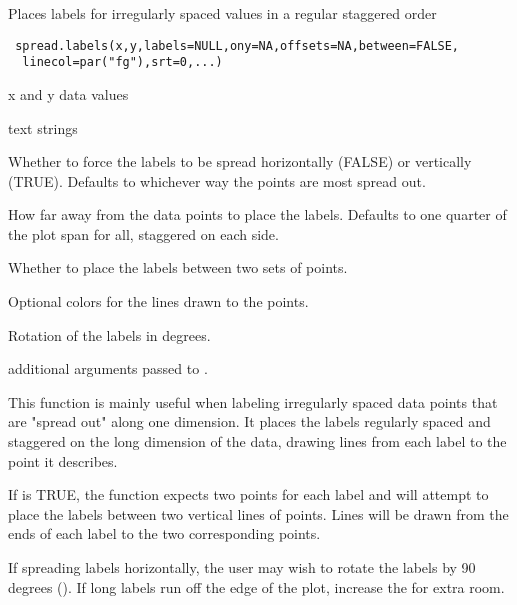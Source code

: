 \begin{Description}\relax
Places labels for irregularly spaced values in a regular staggered order
\end{Description}
\begin{Usage}
\begin{verbatim}
 spread.labels(x,y,labels=NULL,ony=NA,offsets=NA,between=FALSE,
  linecol=par("fg"),srt=0,...)
\end{verbatim}
\end{Usage}
\begin{Arguments}
\begin{ldescription}
\item[\code{x,y}] x and y data values
\item[\code{labels}] text strings
\item[\code{ony}] Whether to force the labels to be spread horizontally
(FALSE) or vertically (TRUE). Defaults to whichever way the points are
most spread out.
\item[\code{offsets}] How far away from the data points to place the labels.
Defaults to one quarter of the plot span for all, staggered on each side.
\item[\code{between}] Whether to place the labels between two sets of points.
\item[\code{linecol}] Optional colors for the lines drawn to the points.
\item[\code{srt}] Rotation of the labels in degrees.
\item[\code{...}] additional arguments passed to .
\end{ldescription}
\end{Arguments}
\begin{Details}\relax
This function is mainly useful when labeling irregularly spaced data points
that are "spread out" along one dimension. It places the labels regularly
spaced and staggered on the long dimension of the data, drawing lines from
each label to the point it describes.

If  is TRUE, the function expects two points for each label
and will attempt to place the labels between two vertical lines of points.
Lines will be drawn from the ends of each label to the two corresponding
points.

If spreading labels horizontally, the user may wish to rotate the labels by
90 degrees (). If long labels run off the edge of the plot,
increase the  for extra room.
\end{Details}
